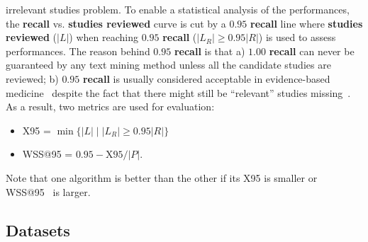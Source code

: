\documentclass{svjour3}
\theoremstyle{break}
\begin{document}



\noindent
irrelevant studies problem. To enable a statistical analysis of the performances, the \textbf{recall} vs. \textbf{studies reviewed} curve is cut by a $0.95$ \textbf{recall} line where \textbf{studies reviewed} ($|L|$) when reaching $0.95$ \textbf{recall} ($|L_R|\geq 0.95|R|$) is used to assess performances. The reason behind 
$0.95$ \textbf{recall} is that a) $1.00$ \textbf{recall} can never be guaranteed by any text mining method unless all the candidate studies are reviewed; b) $0.95$ \textbf{recall} is usually considered acceptable in evidence-based medicine~\cite{cohen2011performance,cohen2006reducing,o2015using} despite the fact that there might still be ``relevant'' studies missing~\cite{shemilt2016use}. As a result, two metrics are used for evaluation:
\begin{itemize}
\item
X95 = $\min \{|L| \mid |L_R|\geq0.95 |R|\}$
\item
WSS@95 = $0.95-\text{X95}/|P|$.
\end{itemize}
Note that one algorithm is better than the other if its X95 is smaller or WSS@95~\cite{cohen2011performance} is larger.


\subsection{Datasets}
\label{sect: datasets}
\end{document}
